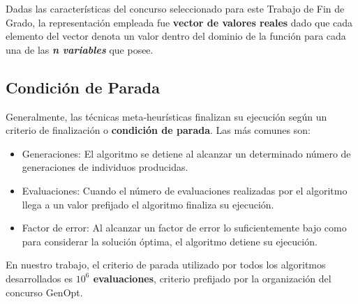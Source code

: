 Dadas las características del concurso seleccionado para este Trabajo de Fin de Grado, la representación empleada fue \textbf{vector de valores reales} dado que cada elemento del vector denota un valor dentro del dominio de la función para cada una de las \textbf{\textit{n variables}} que posee.

\subsection{Condición de Parada}
Generalmente, las técnicas meta-heurísticas finalizan su ejecución según un criterio de finalización o \textbf{condición de parada}. Las más comunes son: 

\bigskip

\begin{itemize}
    \item Generaciones: El algoritmo se detiene al alcanzar un determinado número de generaciones de individuos producidas.
    \item Evaluaciones: Cuando el número de evaluaciones realizadas por el algoritmo llega a un valor prefijado el algoritmo finaliza su ejecución.
    \item Factor de error: Al alcanzar un factor de error lo suficientemente bajo como para considerar la solución óptima, el algoritmo detiene su ejecución.
\end{itemize}

En nuestro trabajo, el criterio de parada utilizado por todos los algoritmos desarrollados es \textbf{$10^{6}$ evaluaciones}, criterio prefijado por la organización del concurso GenOpt. 
